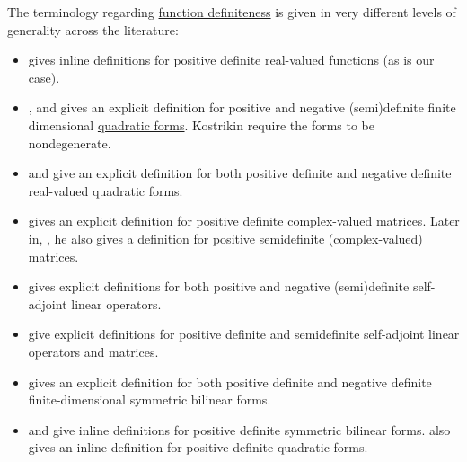 \begin{remark}\label{rem:real_function_definiteness_terminology}
  The terminology regarding \hyperref[def:real_function_definiteness]{function definiteness} is given in very different levels of generality across the literature:
  \begin{itemize}
    \item {} gives inline definitions for positive definite real-valued functions (as is our case).

    \item {},  and  gives an explicit definition for positive and negative (semi)definite finite dimensional \hyperref[thm:quadratic_forms]{quadratic forms}. Kostrikin require the forms to be nondegenerate.

    \item {} and  give an explicit definition for both positive definite and negative definite real-valued quadratic forms.

    \item {} gives an explicit definition for positive definite complex-valued matrices. Later in, \cite[\S 33.6]{Тыртышников2007ЛинейнаяАлгебра}, he also gives a definition for positive semidefinite (complex-valued) matrices.

    \item {} gives explicit definitions for both positive and negative (semi)definite self-adjoint linear operators.

    \item {} give explicit definitions for positive definite and semidefinite self-adjoint linear operators and matrices.

    \item {} gives an explicit definition for both positive definite and negative definite finite-dimensional symmetric bilinear forms.

    \item {} and  give inline definitions for positive definite symmetric bilinear forms.  also gives an inline definition for positive definite quadratic forms.


\end{itemize}
\end{remark}
